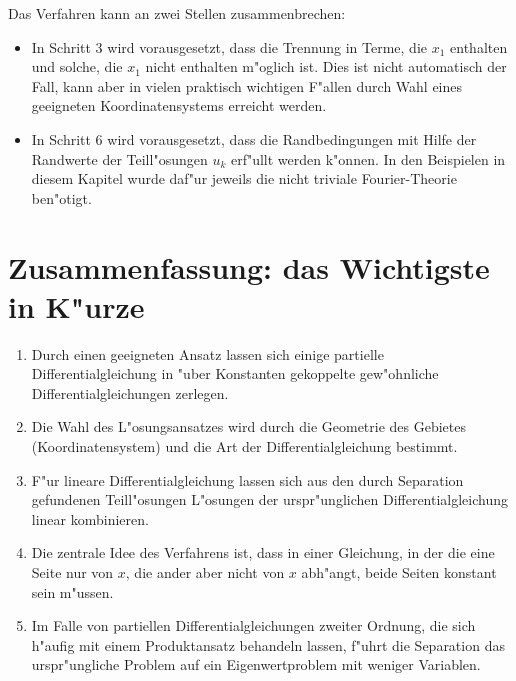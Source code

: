 Das Verfahren kann an zwei Stellen zusammenbrechen:
\begin{itemize}
\item In Schritt 3 wird vorausgesetzt, dass die Trennung in 
Terme, die $x_1$ enthalten  und solche, die $x_1$ nicht enthalten
m"oglich ist. Dies ist nicht automatisch der Fall, kann aber in
vielen praktisch wichtigen F"allen durch Wahl eines geeigneten
Koordinatensystems erreicht werden.
\item In Schritt 6 wird vorausgesetzt, dass die Randbedingungen
mit Hilfe der Randwerte der Teill"osungen $u_k$ erf"ullt werden
k"onnen. In den Beispielen in diesem Kapitel wurde daf"ur jeweils
die nicht triviale Fourier-Theorie ben"otigt. 
\end{itemize}

\section{Zusammenfassung: das Wichtigste in K"urze}
\begin{enumerate}
\item
Durch einen geeigneten Ansatz lassen sich einige partielle
Differentialgleichung in "uber Konstanten gekoppelte gew"ohnliche
Differentialgleichungen zerlegen.
\item
Die Wahl des L"osungsansatzes wird durch die Geometrie des Gebietes
(Koordinatensystem) und die Art der Differentialgleichung bestimmt.
\item
F"ur lineare Differentialgleichung lassen sich aus den durch Separation
gefundenen Teil\-l"o\-sungen L"osungen der urspr"unglichen Differentialgleichung
linear kombinieren.
\item
Die zentrale Idee des Verfahrens ist, dass in einer Gleichung,
in der die eine Seite nur von $x$, die ander aber nicht von $x$
abh"angt, beide Seiten konstant sein m"ussen.
\item
Im Falle von partiellen Differentialgleichungen zweiter Ordnung, die
sich h"aufig mit einem Produktansatz behandeln lassen, f"uhrt die
Separation das urspr"ungliche Problem auf ein Eigenwertproblem mit
weniger Variablen.
\end{enumerate}
